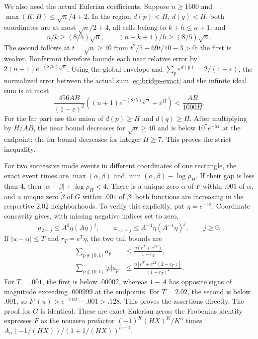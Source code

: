 We also need the actual Eulerian coefficients. Suppose $n\ge1600$
and $\max(K,H)\le\sqrt n/4+2$. In the region $d(p)<H$, $d(q)<H$,
both coordinates are at most $\sqrt n/2+4$, all cells belong to
$k+h\le n+1$, and
\[
 n/k\ge(8/5)\sqrt n,\qquad (n-k+1)/h\ge(8/5)\sqrt n.
\]
The second follows at $t=\sqrt n\ge40$ from
$t^2/5-69t/10-3>0$; the first is weaker.
Bonferroni therefore bounds each near relative error by
$2(n+1)e^{-(8/5)\sqrt n}$.
Using the global envelope and
$\sum_p\varepsilon^{d(p)}=2/(1-\varepsilon)$, the normalized error
between the actual sum \eqref{eq:bridge-exact} and the infinite ideal
sum is at most
\begin{equation}\label{eq:bridge-actual-error}
 \frac{456AB}{(1-\varepsilon)^2}
 \left((n+1)e^{-(8/5)\sqrt n}+\varepsilon^H\right)
 <\frac{AB}{1000H}.
\end{equation}
For the far part use the union of $d(p)\ge H$ and $d(q)\ge H$.
After multiplying by $H/AB$, the near bound decreases for
$\sqrt n\ge40$ and is below $10^7e^{-64}$ at the endpoint; the far
bound decreases for integer $H\ge7$. This proves the strict inequality.

For two successive mode events in different coordinates of one
rectangle, the exact event times are
$\max(\alpha,\beta)$ and $\min(\alpha,\beta)-\log\rho_H$.
If their gap is less than $4$, then
$|\alpha-\beta|+\log\rho_H<4$.
There is a unique zero $\widetilde\alpha$ of $F$ within $.001$ of
$\alpha$, and a unique zero $\widetilde\beta$ of $G$ within $.001$ of
$\beta$; both functions are increasing in the respective
$2.02$ neighborhoods. To verify this explicitly, put $\eta=e^{-12}$.
Coordinate concavity gives, with missing negative indices set to zero,
\[
 a_{2+j}\le A^2\eta(A\eta)^j,\qquad
 a_{-1-j}\le A^{-1}\eta(A^{-1}\eta)^j,\qquad j\ge0.
\]
If $|u-\alpha|\le T$ and $r_T=e^T\eta$, the two tail bounds are
\begin{align*}
 \sum_{p\notin\{0,1\}}a_p
 &\le\frac{\eta(e^T+e^{2T})}{1-r_T},\\
 \sum_{p\notin\{0,1\}}|p|a_p
 &\le\frac{\eta[e^T+e^{2T}(2-r_T)]}{(1-r_T)^2}.
\end{align*}
For $T=.001$, the first is below $.00002$, whereas $1-A$ has
opposite signs of magnitude exceeding $.000999$ at the endpoints.
For $T=2.02$, the second is below $.001$, so
$F'(u)>e^{-2.02}-.001>.128$. This proves the assertions directly.
The proof for $G$ is identical. These are exact Eulerian zeros:
the Frobenius identity expresses $F$ as the nonzero prefactor
$(-1)^K(HX)^K/K^n$ times
$A_n(-1/(HX))/(1+1/(HX))^{n+1}$.

